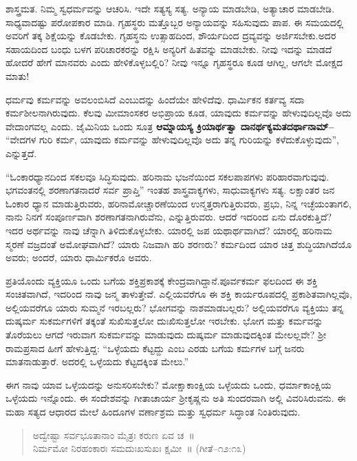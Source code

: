 ಶಾಸ್ತ್ರಮತ. ನಿಮ್ಮ ಸ್ವಧರ್ಮವನ್ನು ಆಚರಿಸಿ. ಇದೇ ಸತ್ಯಸ್ಯ ಸತ್ಯ. ಅನ್ಯಾಯ ಮಾಡಬೇಡಿ, ಅತ್ಯಾಚಾರ ಮಾಡಬೇಡಿ. ಸಾಧ್ಯವಾದಷ್ಟು ಪರೋಪಕಾರ ಮಾಡಿ. ಗೃಹಸ್ಥರು ಮತ್ತೊಬ್ಬರ ಅನ್ಯಾಯವನ್ನು ಸಹಿಸುವುದು ಪಾಪ. ಈ ಸಮಯದಲ್ಲಿ ಅವರಿಗೆ ತಕ್ಕ ಶಿಕ್ಷೆಯನ್ನು ಕೊಡಬೇಕು. ಗೃಹಸ್ಥನು ಉತ್ಸಾಹದಿಂದ, ಶೌರ್ಯದಿಂದ ದ್ರವ್ಯವನ್ನು ಅರ್ಜಿಸಬೇಕು.ಅದರ ಸಹಾಯದಿಂದ ಬಂಧು ಬಳಗ ಪರಿಚಾರಕರನ್ನು ರಕ್ಷಿಸಿ ಅನ್ಯರಿಗೆ ಹಿತವನ್ನು ಮಾಡಬೇಕು. ನೀವು ಇದನ್ನು ಮಾಡದೆ ಹೋದರೆ ಹೇಗೆ ಮಾನವರು ಎಂದು ಹೇಳಿಕೊಳ್ಳಬಲ್ಲಿರಿ? ನೀವು ಇನ್ನೂ ಗೃಹಸ್ಥರೂ ಕೂಡ ಆಗಿಲ್ಲ, ಆಗಲೇ ಮೋಕ್ಷದ ಮಾತು!

ಧರ್ಮವು ಕರ್ಮವನ್ನು ಅವಲಂಬಿಸಿದೆ ಎಂಬುದನ್ನು ಹಿಂದೆಯೇ ಹೇಳಿದೆವು. ಧಾರ್ಮಿ\break ಕನ ಕರ್ತವ್ಯ ಸದಾ ಕರ್ಮಶೀಲನಾಗಿರುವುದು. ಕೆಲವು ಮೀಮಾಂಸಕರ ಅಭಿಪ್ರಾಯ ಕೂಡ, ಯಾವುದು ಕರ್ಮವನ್ನು ಹೇಳುವುದಿಲ್ಲವೊ ಅದು ವೇದಾಂಗವಲ್ಲ ಎಂದು. ಜೈಮಿನಿಯ ಒಂದು ಸೂತ್ರ \textbf{ಆಮ್ನಾಯಸ್ಯ ಕ್ರಿಯಾರ್ಥತ್ವಾ ದಾನರ್ಥಕ್ಯಮತದರ್ಥಾನಾಮ್​–} “ವೇದಗಳ ಗುರಿ ಕರ್ಮ, ಯಾವುದು ಕರ್ಮವನ್ನು ಹೇಳುವುದಿಲ್ಲವೊ ಅದು ತನ್ನ ಗುರಿಯನ್ನು ಕಳೆದುಕೊಳ್ಳುವುದು”, ಎನ್ನುತ್ತದೆ.

“ಓಂಕಾರಧ್ಯಾನದಿಂದ ಸಕಲವೂ ಸಿದ್ಧಿಸುವುದು. ಹರಿನಾಮ ಭಜನೆಯಿಂದ ಸಕಲ\break ಪಾಪಗಳು ಪರಿಹಾರವಾಗುವುವು. ಭಗವಂತನಲ್ಲಿ ಶರಣಾಗತನಾದರೆ ಸರ್ವ ಪ್ರಾಪ್ತಿ” ಇಂತಹ ಶಾಸ್ತ್ರವಾಕ್ಯಗಳು, ಸಾಧುವಾಕ್ಯಗಳು ಸತ್ಯ. ಲಕ್ಷಾಂತರ ಜನ ಓಂಕಾರ ಧ್ಯಾನ ಮಾಡುತ್ತಿರುವರು, ಹರಿನಾಮೋಚ್ಚಾರಣೆಯಿಂದ ಉನ್ಮತ್ತರಾಗುತ್ತಿರುವರು, ಪ್ರಭು, ನಿನ್ನ ಇಚ್ಛೆಯಂತಾಗಲಿ, ನಾನು ನಿನಗೆ ಸಂಪೂರ್ಣವಾಗಿ ಶರಣಾಗತನಾಗಿರುವೆನು, ಎನ್ನುತ್ತಿರು\-ವರು. ಆದರೆ ಇದರಿಂದ ಏನು ದೊರಕುತ್ತಿದೆ? ಇದರ ಅರ್ಥವನ್ನು ನಾವು ಚೆನ್ನಾಗಿ ತಿಳಿದುಕೊಳ್ಳಬೇಕು. ಯಾರಲ್ಲಿ ಜಪ ಯಥಾರ್ಥವಾಗಿದೆ? ಯಾರಲ್ಲಿ ಹರಿನಾಮ ಸ್ಮರಣೆ ವಜ್ರದಂತೆ ಅಮೋಘವಾಗಿದೆ? ಯಾರು ನಿಜವಾಗಿ ಹರಿ ಶರಣರು? ಕರ್ಮದಿಂದ ಯಾರ ಚಿತ್ತ ಶುದ್ಧಿಯಾಗಿದೆಯೊ ಅವರು; ಅಂದರೆ, ಯಾರು ಧಾರ್ಮಿಕರೊ ಅವರು.

ಪ್ರತಿಯೊಂದು ವ್ಯಕ್ತಿಯೂ ಒಂದು ಬಗೆಯ ಶಕ್ತಿಪ್ರಕಾಶಕ್ಕೆ ಕೇಂದ್ರವಾಗಿದ್ದಾನೆ.\break ಪೂರ್ವಕರ್ಮ ಫಲದಿಂದ ಈ ಶಕ್ತಿ ಸಂಚಿತವಾಗಿದೆ, ಇದರಿಂದ ನಾವು ಜನ್ಮ ತಾಳುತ್ತೇವೆ. ಎಲ್ಲಿಯವರೆಗೂ ಈ ಶಕ್ತಿ ಕಾರ್ಯರೂಪದಲ್ಲಿ ಪ್ರಕಾಶಿತವಾಗಿಲ್ಲವೊ, ಅಲ್ಲಿಯವರೆಗೂ ಯಾರು ಸುಮ್ಮನೆ ಇರಬಲ್ಲರು? ಭೋಗವನ್ನು ನಾಶಮಾಡಬಲ್ಲರು? ಅಲ್ಲಿಯವರೆಗೂ ವ್ಯಕ್ತಿಯು ತನ್ನ ದುಷ್ಕರ್ಮ ಸುಕರ್ಮಗಳಿಗೆ ತಕ್ಕಂತೆ ಸುಖಿಸುತ್ತಲೋ ದುಃಖಿಸುತ್ತಲೋ ಇರಬೇಕು. ಭೋಗ ಮತ್ತು ಕರ್ಮವನ್ನು ತೊರೆಯಲು ಆಗದೆ ಇರುವಾಗ ಸುಕರ್ಮವನ್ನು ಮಾಡುವುದು ದುಷ್ಕರ್ಮ ಮಾಡುವುದಕ್ಕಿಂತ ಮೇಲಲ್ಲವೇ? ಶ‍್ರೀ ರಾಮಪ್ರಸಾದ ಹೀಗೆ ಹೇಳುತ್ತಿದ್ದ: “ಒಳ್ಳೆಯದು ಕೆಟ್ಟದ್ದು ಎಂಬ ಎರಡು ಬಗೆಯ ಕರ್ಮಗಳ ಬಗ್ಗೆ ಜನರು ಮಾತನಾಡುತ್ತಾರೆ. ಅದರಲ್ಲಿ ಒಳ್ಳೆಯದು ಕೆಟ್ಟದಕ್ಕಿಂತ ಮೇಲು.”

\eject

ಈಗ ನಾವು ಯಾವ ಒಳ್ಳೆಯದನ್ನು ಅನುಸರಿಸಬೇಕು? ಮೋಕ್ಷಾಕಾಂಕ್ಷಿಯ ಒಳ್ಳೆಯದು ಒಂದು, ಧರ್ಮಾಕಾಂಕ್ಷಿಯ ಒಳ್ಳೆಯದು ಇನ್ನೊಂದು. ಈ ಸಂದೇಶವನ್ನು ಗೀತಾಚಾರ್ಯ ಶ‍್ರೀಕೃಷ್ಣನು ಅತಿ ಸುಂದರವಾಗಿ ಅಲ್ಲಿ ವಿವರಿಸಿರುವನು. ಈ ಮಹಾ ಸತ್ಯದ ಆಧಾರದ ಮೇಲೆ ಹಿಂದೂಗಳ ವರ್ಣಾಶ್ರಮ ಮತ್ತು ಸ್ವಧರ್ಮ ಸಿದ್ಧಾಂತ ನಿಂತಿರುವುದು.
\begin{verse}
ಅದ್ವೇಷ್ಟಾ ಸರ್ವಭೂತಾನಾಂ ಮೈತ್ರಃ ಕರುಣ ಏವ ಚ~॥\\ನಿರ್ಮಮೋ ನಿರಹಂಕಾರಃ ಸಮದುಃಖಸುಖಃ ಕ್ಷಮೀ~॥ (ಗೀತೆ–೧೨:೧೩)
\end{verse}

